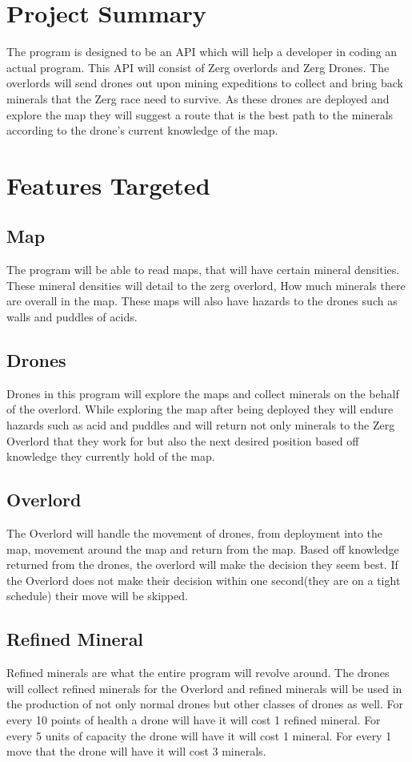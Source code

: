 \documentclass[12pt]{article}
\begin{document}
\section{Project Summary}
The program is designed to be an API which will help a developer in coding an actual program. This API will consist of Zerg overlords and Zerg Drones. The overlords will send drones out upon mining expeditions to collect and bring back minerals that the Zerg race need to survive. As these drones are deployed and explore the map they will suggest a route that is the best path to the minerals according to the drone's current knowledge of the map.
\section{Features Targeted}
\subsection{Map}
The program will be able to read maps, that will have certain mineral densities. These mineral densities will detail to the zerg overlord, How much minerals there are overall in the map. These maps will also have hazards to the drones such as walls and puddles of acids.
\subsection{Drones}
Drones in this program will explore the maps and collect minerals on the behalf of the overlord. While exploring the map after being deployed they will endure hazards such as acid and puddles and will return not only minerals to the Zerg Overlord that they work for but also the next desired position based off knowledge they currently hold of the map.
\subsection{Overlord}
The Overlord will handle the movement of drones, from deployment into the map, movement around the map and return from the map. Based off knowledge returned from the drones, the overlord will make the decision they seem best. If the Overlord does not make their decision within one second(they are on a tight schedule) their move will be skipped.
\newpage
\subsection{Refined Mineral}
Refined minerals are what the entire program will revolve around. The drones will collect refined minerals for the Overlord and refined minerals will be used in the production of not only normal drones but other classes of drones as well. For every 10 points of health a drone will have it will cost 1 refined mineral. For every 5 units of capacity the drone will have it will cost 1 mineral. For every 1 move that the drone will have it will cost 3 minerals.
\end{document}

